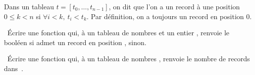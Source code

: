 Dans un tableau $t = [t_0,\dots,t_{n-1}]$, on dit que l'on a un record à une position $0 \leq k < n$ si $\forall i < k,~ t_i < t_k$. 
Par définition, on a toujours un record en position 0.


\question\ \'Ecrire une fonction  qui, à un tableau de nombres  et un entier , renvoie le booléen  si  admet un record en position ,  sinon.

\question\ \'Ecrire une fonction  qui, à un tableau de nombres , renvoie le nombre de records dans~.
